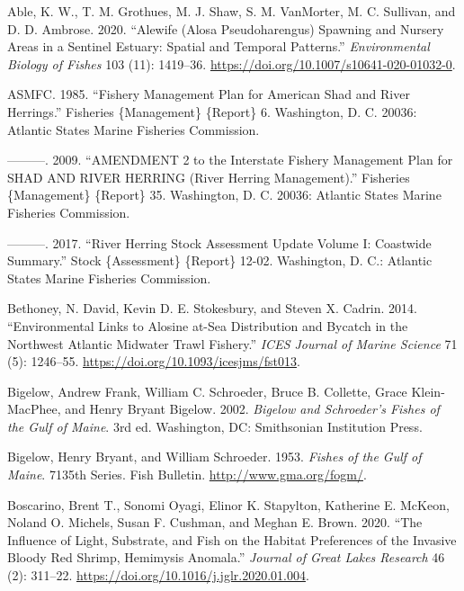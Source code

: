 \documentclass[
]{book}
\newlength{\cslhangindent}
\newlength{\cslentryspacingunit} %
\newenvironment{CSLReferences}[2] %
 {%
  \setlength{\parindent}{0pt}
  \ifodd #1
  \let\oldpar\par
  \def\par{\hangindent=\cslhangindent\oldpar}
  \fi
  \setlength{\parskip}{#2\cslentryspacingunit}
 }%
 {}
\begin{document}
\hypertarget{refs}{}
\begin{CSLReferences}{1}{0}
\leavevmode{}%
Able, K. W., T. M. Grothues, M. J. Shaw, S. M. VanMorter, M. C. Sullivan, and D. D. Ambrose. 2020. {``Alewife ({Alosa} Pseudoharengus) Spawning and Nursery Areas in a Sentinel Estuary: Spatial and Temporal Patterns.''} \emph{Environmental Biology of Fishes} 103 (11): 1419--36. \url{https://doi.org/10.1007/s10641-020-01032-0}.

\leavevmode{}%
ASMFC. 1985. {``Fishery {Management} {Plan} for {American} {Shad} and {River} {Herrings}.''} Fisheries \{Management\} \{Report\} 6. Washington, D. C. 20036: Atlantic States Marine Fisheries Commission.

\leavevmode{}%
---------. 2009. {``{AMENDMENT} 2 to the {Interstate} {Fishery} {Management} {Plan} for {SHAD} {AND} {RIVER} {HERRING} ({River} {Herring} {Management}).''} Fisheries \{Management\} \{Report\} 35. Washington, D. C. 20036: Atlantic States Marine Fisheries Commission.

\leavevmode{}%
---------. 2017. {``River {Herring} {Stock} {Assessment} {Update} {Volume} {I}: {Coastwide} {Summary}.''} Stock \{Assessment\} \{Report\} 12-02. Washington, D. C.: Atlantic States Marine Fisheries Commission.

\leavevmode{}%
Bethoney, N. David, Kevin D. E. Stokesbury, and Steven X. Cadrin. 2014. {``Environmental Links to Alosine at-Sea Distribution and Bycatch in the {Northwest} {Atlantic} Midwater Trawl Fishery.''} \emph{ICES Journal of Marine Science} 71 (5): 1246--55. \url{https://doi.org/10.1093/icesjms/fst013}.

\leavevmode{}%
Bigelow, Andrew Frank, William C. Schroeder, Bruce B. Collette, Grace Klein-MacPhee, and Henry Bryant Bigelow. 2002. \emph{Bigelow and {Schroeder}'s Fishes of the {Gulf} of {Maine}}. 3rd ed. Washington, DC: Smithsonian Institution Press.

\leavevmode{}%
Bigelow, Henry Bryant, and William Schroeder. 1953. \emph{Fishes of the {Gulf} of {Maine}}. 7135th Series. Fish Bulletin. \url{http://www.gma.org/fogm/}.

\leavevmode{}%
Boscarino, Brent T., Sonomi Oyagi, Elinor K. Stapylton, Katherine E. McKeon, Noland O. Michels, Susan F. Cushman, and Meghan E. Brown. 2020. {``The Influence of Light, Substrate, and Fish on the Habitat Preferences of the Invasive Bloody Red Shrimp, {Hemimysis} Anomala.''} \emph{Journal of Great Lakes Research} 46 (2): 311--22. \url{https://doi.org/10.1016/j.jglr.2020.01.004}.


\end{CSLReferences}
\end{document}
